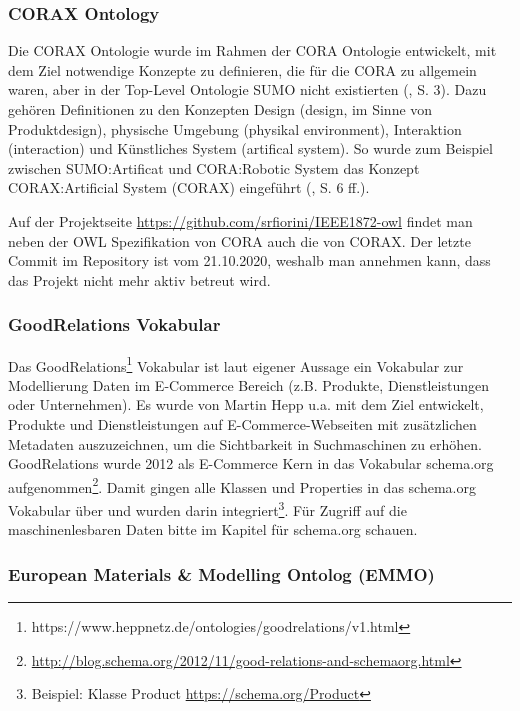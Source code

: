 \documentclass{article}
\begin{document}
\subsubsection{CORAX Ontology}


Die CORAX Ontologie wurde im Rahmen der CORA Ontologie entwickelt, mit dem Ziel notwendige Konzepte zu definieren, die für die CORA zu allgemein waren, aber in der Top-Level Ontologie SUMO nicht existierten (\cite{fiorini2015extensions}, S. 3).
Dazu gehören Definitionen zu den Konzepten Design (design, im Sinne von Produktdesign), physische Umgebung (physikal environment), Interaktion (interaction) und Künstliches System (artifical system).
So wurde zum Beispiel zwischen SUMO:Artificat und CORA:Robotic System das Konzept CORAX:Artificial System (CORAX) eingeführt (\cite{fiorini2015extensions}, S. 6 ff.).

Auf der Projektseite \url{https://github.com/srfiorini/IEEE1872-owl} findet man neben der OWL Spezifikation von CORA auch die von CORAX. Der letzte Commit im Repository ist vom 21.10.2020, weshalb man annehmen kann, dass das Projekt nicht mehr aktiv betreut wird.

\subsubsection{GoodRelations Vokabular}

Das GoodRelations\footnote{https://www.heppnetz.de/ontologies/goodrelations/v1.html} Vokabular ist laut eigener Aussage ein Vokabular zur Modellierung Daten im E-Commerce Bereich (z.B. Produkte, Dienstleistungen oder Unternehmen).
Es wurde von Martin Hepp u.a. mit dem Ziel entwickelt, Produkte und Dienstleistungen auf E-Commerce-Webseiten mit zusätzlichen Metadaten auszuzeichnen, um die Sichtbarkeit in Suchmaschinen zu erhöhen.
GoodRelations wurde 2012 als E-Commerce Kern in das Vokabular schema.org aufgenommen\footnote{\url{http://blog.schema.org/2012/11/good-relations-and-schemaorg.html}}.
Damit gingen alle Klassen und Properties in das schema.org Vokabular über und wurden darin integriert\footnote{Beispiel: Klasse Product \url{https://schema.org/Product}}.
Für Zugriff auf die maschinenlesbaren Daten bitte im Kapitel für schema.org schauen.

\subsubsection{European Materials \& Modelling Ontolog (EMMO)}
\end{document}
